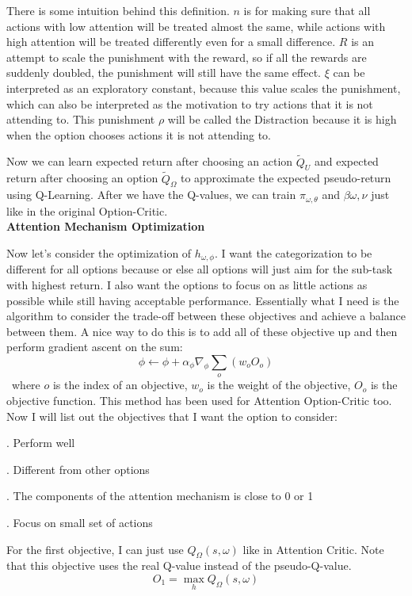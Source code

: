 \documentclass{article}
\begin{document}
	\quad There is some intuition behind this definition. $n$ is for making sure that all actions with low attention will be treated almost the same, while actions with high attention will be treated differently even for a small difference. $R$ is an attempt to scale the punishment with the reward, so if all the rewards are suddenly doubled, the punishment will still have the same effect. $\xi$ can be interpreted as an exploratory constant, because this value scales the punishment, which can also be interpreted as the motivation to try actions that it is not attending to. This punishment $
	\rho$ will be called the Distraction because it is high when the option chooses actions it is not attending to.
	
	\quad Now we can learn expected return after choosing an action $\widetilde{Q}_U$ and expected return after choosing an option $\widetilde{Q}_\Omega$ to approximate the expected pseudo-return using Q-Learning. After we have the Q-values, we can train $\pi_{\omega,\theta}$ and $\beta{\omega, \nu}$ just like in the original Option-Critic.\vspace{0.2in}\\
	{\bfseries Attention Mechanism Optimization}\vspace{0.05in}
	
	\quad Now let's consider the optimization of $h_{\omega,\phi}$. I want the categorization to be different for all options because or else all options will just aim for the sub-task with highest return. I also want the options to focus on as little actions as possible while still having acceptable performance. Essentially what I need is the algorithm to consider the trade-off between these objectives and achieve a balance between them. A nice way to do this is to add all of these objective up and then perform gradient ascent on the sum: $$\phi \leftarrow \phi + \alpha_\phi \nabla_\phi \sum_{o} (w_o O_o)$$ \qquad \ where $o$ is the index of an objective, $w_o$ is the weight of the objective, $O_o$ is the objective function.
	\quad This method has been used for Attention Option-Critic too. Now I will list out the objectives that I want the option to consider: 
	
	. Perform well
	
	. Different from other options
	
	. The components of the attention mechanism is close to 0 or 1
	
	. Focus on small set of actions
	
	\quad For the first objective, I can just use $Q_\Omega(s,\omega)$ like in Attention Critic. Note that this objective uses the real Q-value instead of the pseudo-Q-value. $$O_1=\max_h Q_\Omega(s,\omega)$$
	
\end{document}
